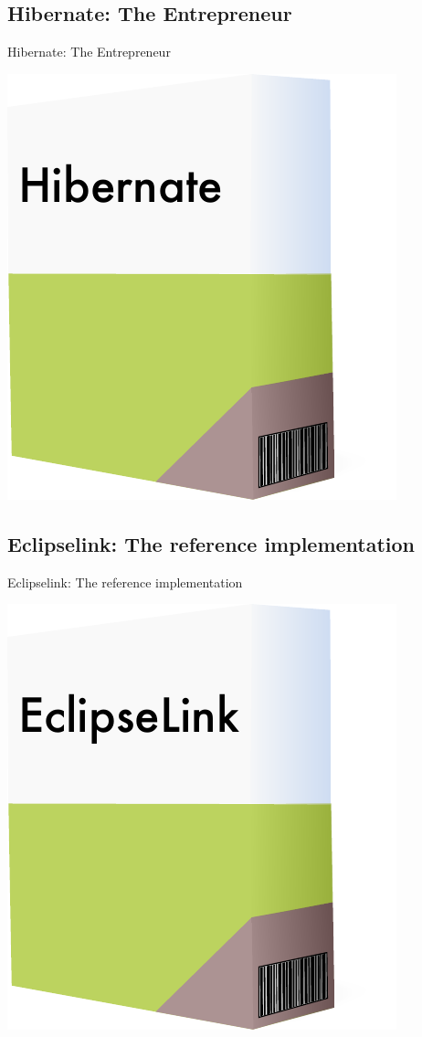 \documentclass[xcolor=x11names,compress]{beamer}
\renewcommand{\(}{\begin{columns}}
\renewcommand{\)}{\end{columns}}
\newcommand{\<}[1]{\begin{column}{#1}}
\renewcommand{\>}{\end{column}}
\begin{document}
\subsection{Hibernate: The Entrepreneur}
\begin{frame}{Hibernate: The Entrepreneur}

\begin{center}

\includegraphics[keepaspectratio,width=.45\textwidth]{Hibernate}

\end{center}
\end{frame}

\subsection{Eclipselink: The reference implementation}
\begin{frame}{Eclipselink: The reference implementation}

\begin{center}

\includegraphics[keepaspectratio,width=.45\textwidth]{EclipseLink}

\end{center}
\end{frame}
\end{document}
